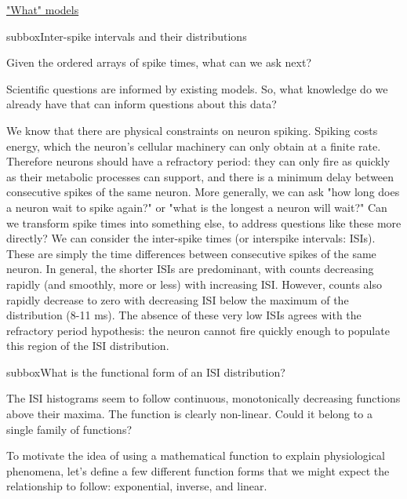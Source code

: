 \begin{textbox}{\href{https://compneuro.neuromatch.io/tutorials/W1D1_ModelTypes/student/W1D1_Tutorial1.html}{"What" models }   }
\begin{subbox}{subbox}{Inter-spike intervals and their distributions}
\scriptsize

Given the ordered arrays of spike times, what can we ask next?

Scientific questions are informed by existing models. So, what knowledge do we already have that can inform questions about this data?

We know that there are physical constraints on neuron spiking. Spiking costs energy, which the neuron's cellular machinery can only obtain at a finite rate. Therefore neurons should have a refractory period: they can only fire as quickly as their metabolic processes can support, and there is a minimum delay between consecutive spikes of the same neuron.
More generally, we can ask "how long does a neuron wait to spike again?" or "what is the longest a neuron will wait?" Can we transform spike times into something else, to address questions like these more directly?
We can consider the inter-spike times (or interspike intervals: ISIs). These are simply the time differences between consecutive spikes of the same neuron.
In general, the shorter ISIs are predominant, with counts decreasing rapidly (and smoothly, more or less) with increasing ISI. However, counts also rapidly decrease to zero with decreasing ISI below the maximum of the distribution (8-11 ms). The absence of these very low ISIs agrees with the refractory period hypothesis: the neuron cannot fire quickly enough to populate this region of the ISI distribution.

\end{subbox}
\begin{subbox}{subbox}{What is the functional form of an ISI distribution?}
\scriptsize


The ISI histograms seem to follow continuous, monotonically decreasing functions above their maxima. The function is clearly non-linear. Could it belong to a single family of functions?

To motivate the idea of using a mathematical function to explain physiological phenomena, let's define a few different function forms that we might expect the relationship to follow: exponential, inverse, and linear.

\begin{center}
    

\end{center}
\end{subbox}
\end{textbox}
